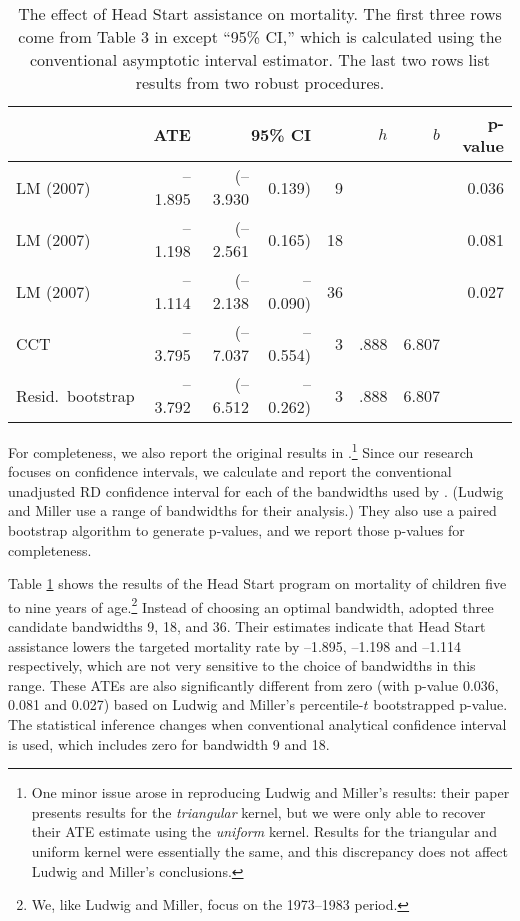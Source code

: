 \documentclass[12pt,fleqn]{article}
\begin{document}
\begin{table}[t]
  \centering
  \begin{tabular}{lrr@{, }rr@{}rrr}
    \toprule
                      & ATE     & \multicolumn{2}{r}{95\% CI}            &     &  $h$ &   $b$ & p-value \\
    \midrule
    LM (2007)         & --1.895 & (--3.930                    & 0.139)   & 9   &      &       & 0.036 \\
    LM (2007)         & --1.198 & (--2.561                    & 0.165)   & 18  &      &       & 0.081 \\
    LM (2007)         & --1.114 & (--2.138                    & --0.090) & 36  &      &       & 0.027 \\
    CCT               & --3.795 & (--7.037                    & --0.554) & 3   & .888 & 6.807 &       \\
    Resid.\ bootstrap & --3.792 & (--6.512                    & --0.262) & 3   & .888 & 6.807 &       \\
    \bottomrule
  \end{tabular}
  \caption{The effect of Head Start assistance on mortality. The first three
    rows come from Table 3 in \cite{ludwig2007} except ``95\% CI,'' which is
    calculated using the conventional asymptotic interval estimator.
    The last two rows list results from two robust procedures.}
  \label{tbl:2}
\end{table}

For completeness, we also report the
original results in \cite{ludwig2007}.\footnote{%
  One minor issue arose in reproducing Ludwig and Miller's results: their paper
  presents results for the \emph{triangular} kernel, but we were only able to
  recover their ATE estimate using the \emph{uniform} kernel. Results for the
  triangular and uniform kernel were essentially the same, and this discrepancy
  does not affect Ludwig and Miller's conclusions.} %
Since our research focuses on confidence intervals, we calculate and report
the conventional unadjusted RD confidence interval for each of the bandwidths
used by \cite{ludwig2007}. (Ludwig and Miller use a range of bandwidths
for their analysis.) They also use a paired bootstrap algorithm to generate
p-values, and we report those p-values for completeness.

Table \ref{tbl:2} shows the results of the Head Start program on mortality of
children five to nine years of age.\footnote{%
  We, like Ludwig and Miller, focus on the 1973--1983 period.} %
Instead of choosing an optimal bandwidth, \cite{ludwig2007} adopted three
candidate bandwidths 9, 18, and 36. Their estimates indicate that Head Start
assistance lowers the targeted mortality rate by --1.895, --1.198 and --1.114
respectively, which are not very sensitive to the choice of bandwidths in this
range. These ATEs are also significantly different from zero (with p-value
0.036, 0.081 and 0.027) based on Ludwig and Miller's percentile-$t$ bootstrapped
p-value. The statistical inference changes when conventional analytical
confidence interval is used, which includes zero for bandwidth 9 and 18.
\end{document}
